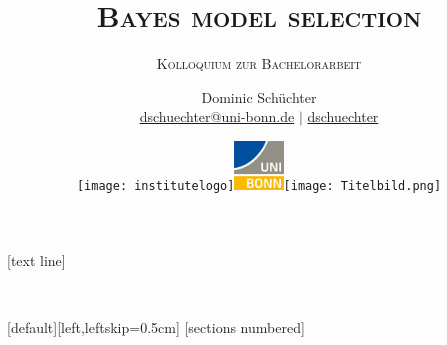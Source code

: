 \documentclass[11pt,aspectratio=1610,dvipsnames]{beamer}
\begin{document}
\author{{\Large Dominic Schüchter}\\ \scriptsize \href{mail:dschuechter@uni-bonn.de}{\faEnvelope  \hspace*{0.1cm}dschuechter@uni-bonn.de} {\color{black}$|$} \href{https://github.com/dschuechter}{\faGithub  \hspace*{0.1cm}dschuechter}}
\title{\textsc{Bayes model selection}}
\subtitle{\textsc{Kolloquium zur Bachelorarbeit}}

\date{\texttt{[image: institutelogo]}\hspace{10px}\includegraphics[width=1.3cm]{UniBonnLogo}}
\date{\texttt{[image: Titelbild.png]}}


[text line]{\parbox{0.3\linewidth}{\vspace*{-9pt}\textcolor{white} \insertsection  \hfill} \parbox{0.7\linewidth}{\vspace*{-8pt} \textcolor{white} {\hspace{1.5cm}\textsc{\insertshorttitle}  \hfill \insertpagenumber/XXXXXX}}}


[default][left,leftskip=0.5cm]
%
[sections numbered]
\captionsetup{font=scriptsize,labelfont=scriptsize}

\newcommand{\dracocoords}{gal. Breite: $84.1^\circ$ bis $95.9^\circ$, gal. Länge: $32.9^\circ$ bis $42.8^\circ$ }
\newcommand{\orionbubblecoords}{gal. Breite: $200^\circ$ bis $215^\circ$, gal. Länge: $-15^\circ$ bis $-27^\circ$ }
\end{document}
